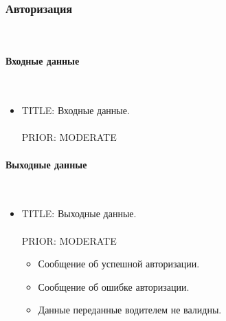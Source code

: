 \subsubsection{Авторизация} \mbox{} \\ \label{}

    \paragraph{Входные данные} \mbox{} \\ \label{}

		\begin{itemize}

		\item{

		  TITLE: Входные данные.\\
		  \\
		  PRIOR: MODERATE\\

		}

		\end{itemize}

    \paragraph{Выходные данные} \mbox{} \\

      \begin{itemize}

        \item{

          TITLE: Выходные данные.\\
          \\
          PRIOR: MODERATE\\

        }

        \begin{itemize}
          \item Сообщение об успешной авторизации. 
          \item Сообщение об ошибке авторизации. 
        \end{itemize}
          \begin{itemize}
            \item Данные переданные водителем не валидны.
          \end{itemize}

      \end{itemize}

